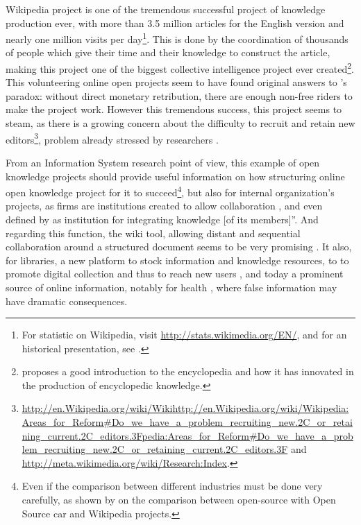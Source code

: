 
Wikipedia project is one of the tremendous successful project of knowledge
production ever, with more than 3.5 million articles for the English
version and nearly one million visits per day\footnote{For statistic on Wikipedia, visit \url{http://stats.wikimedia.org/EN/},
and for an historical presentation, see \citet{Lih09}.}. This is done by the coordination of thousands of people which give
their time and their knowledge to construct the article, making this
project one of the biggest collective intelligence project ever created\footnote{\citet{Olleros08} proposes a good introduction to the encyclopedia
and how it has innovated in the production of encyclopedic knowledge.}. This volunteering online open projects seem to have found original
answers to \citet{Olson65}'s paradox: without direct monetary retribution,
there are enough non-free riders to make the project work. However
this tremendous success, this project seems to steam, as there is
a growing concern about the difficulty to recruit and retain new editors\footnote{\url{http://en.Wikipedia.org/wiki/Wikihttp://en.Wikipedia.org/wiki/Wikipedia:Areas_for_Reform#Do_we_have_a_problem_recruiting_new.2C_or_retaining_current.2C_editors.3Fpedia:Areas_for_Reform#Do_we_have_a_problem_recruiting_new.2C_or_retaining_current.2C_editors.3F}
and \url{http://meta.wikimedia.org/wiki/Research:Index}.}, problem already stressed by researchers \citep{Ortega09}.

From an Information System research point of view, this example of
open knowledge projects should provide useful information on how structuring
online open knowledge project for it to succeed\footnote{Even if the comparison between different industries must be done very
carefully, as shown by \citet{MullerSeitzReger09} on the comparison
between open-source with Open Source car and Wikipedia projects.}, but also for internal organization's projects, as firms are institutions
created to allow collaboration \citep{Simon57,MarchSimon58}, and
even defined by \citet{Grant96} as \textquotedbl{}institution for
integrating knowledge {[}of its members{]}''. And regarding this
function, the wiki tool, allowing distant and sequential collaboration
around a structured document seems to be very promising \citep{HasanPfaff06a,HasanPfaff06b,HasanPfaff06c}.
It also, for libraries, a new platform to stock information and knowledge
resources, to to promote digital collection and thus to reach new
users \citep{PressleyMcCallum08}, and today a prominent source of
online information, notably for health \citep{LaurentVickers09},
where false information may have dramatic consequences. 

